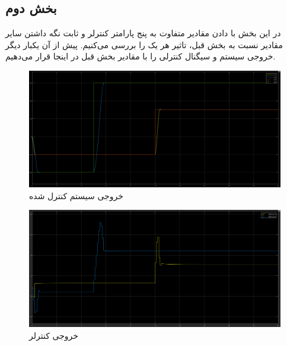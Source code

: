 \documentclass[14pt, a4paper]{extarticle}
\begin{document}
\subsection{بخش دوم}
در این بخش با دادن مقادیر متفاوت به پنج پارامتر کنترلر و ثابت نگه داشتن سایر مقادیر نسبت به بخش قبل، تاثیر هر یک را بررسی می‌کنیم. پیش از آن یکبار دیگر خروجی سیستم و سیگنال کنترلی را با مقادیر بخش قبل در اینجا قرار می‌دهیم.\\
\begin{figure}[h!]
	\centering
	\includegraphics[scale = 0.3]{Q2_sim_result.png}
	\caption{خروجی سیستم کنترل شده}
\end{figure}
\begin{figure}[h!]
	\centering
	\includegraphics[scale = 0.3]{Q2_sim_control.png}
	\caption{خروجی کنترلر}
\end{figure}

\newpage
\end{document}
